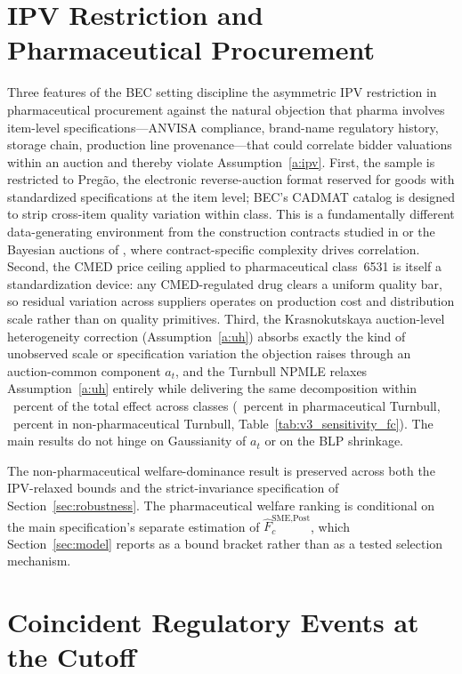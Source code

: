 \section{IPV Restriction and Pharmaceutical Procurement}\label{app:robustness_ipv}

Three features of the BEC setting discipline the asymmetric IPV restriction in pharmaceutical procurement against the natural objection that pharma involves item-level specifications---ANVISA compliance, brand-name regulatory history, storage chain, production line provenance---that could correlate bidder valuations within an auction and thereby violate Assumption~\ref{a:ipv}. First, the sample is restricted to Preg\~ao, the electronic reverse-auction format reserved for goods with standardized specifications at the item level; BEC's CADMAT catalog is designed to strip cross-item quality variation within class. This is a fundamentally different data-generating environment from the construction contracts studied in \citet{bajari2014} or the Bayesian auctions of \citet{hendricks2003}, where contract-specific complexity drives correlation. Second, the CMED price ceiling applied to pharmaceutical class~6531 is itself a standardization device: any CMED-regulated drug clears a uniform quality bar, so residual variation across suppliers operates on production cost and distribution scale rather than on quality primitives. Third, the Krasnokutskaya auction-level heterogeneity correction (Assumption~\ref{a:uh}) absorbs exactly the kind of unobserved scale or specification variation the objection raises through an auction-common component $a_t$, and the Turnbull NPMLE relaxes Assumption~\ref{a:uh} entirely while delivering the same decomposition within \turnbullDeviationPct~percent of the total effect across classes (\turnbullDeviationPct~percent in pharmaceutical Turnbull, \turnbullDeviationNpPct~percent in non-pharmaceutical Turnbull, Table~\ref{tab:v3_sensitivity_fc}). The main results do not hinge on Gaussianity of $a_t$ or on the BLP shrinkage.

The non-pharmaceutical welfare-dominance result is preserved across both the IPV-relaxed bounds and the strict-invariance specification of Section~\ref{sec:robustness}. The pharmaceutical welfare ranking is conditional on the main specification's separate estimation of $\hat F_c^{\text{SME,Post}}$, which Section~\ref{sec:model} reports as a bound bracket rather than as a tested selection mechanism.

\section{Coincident Regulatory Events at the \policyCutoffMonth{} Cutoff}\label{app:cutoff}

